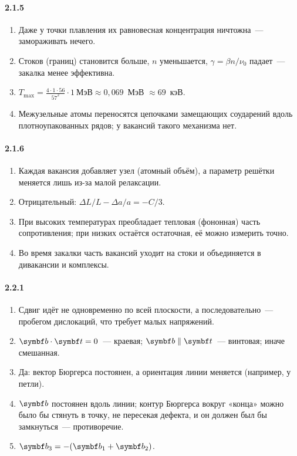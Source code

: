 {\paragraph{2.1.5}
\begin{enumerate}[label=\arabic*.]
\item Даже у точки плавления их равновесная концентрация ничтожна~—
замораживать нечего.
\item Стоков (границ) становится больше, $n$ уменьшается, $\gamma=\beta n/\nu_0$
падает~— закалка менее эффективна.
\item $T_{\max}=\frac{4\cdot1\cdot56}{57^2}\cdot1~\text{МэВ}\approx0{,}069$~МэВ
$\approx69$~кэВ.
\item Межузельные атомы переносятся цепочками замещающих соударений вдоль
плотноупакованных рядов; у вакансий такого механизма нет.
\end{enumerate}

\paragraph{2.1.6}
\begin{enumerate}[label=\arabic*.]
\item Каждая вакансия добавляет узел (атомный объём), а параметр решётки
меняется лишь из-за малой релаксации.
\item Отрицательный: $\Delta L/L-\Delta a/a=-C/3$.
\item При высоких температурах преобладает тепловая (фононная) часть
сопротивления; при низких остаётся остаточная, её можно измерить точно.
\item Во время закалки часть вакансий уходит на стоки и объединяется в
дивакансии и комплексы.
\end{enumerate}

\paragraph{2.2.1}
\begin{enumerate}[label=\arabic*.]
\item Сдвиг идёт не одновременно по всей плоскости, а последовательно~—
пробегом дислокаций, что требует малых напряжений.
\item $\vb b\cdot\vb t=0$~— краевая; $\vb b\parallel\vb t$~— винтовая;
иначе смешанная.
\item Да: вектор Бюргерса постоянен, а ориентация линии меняется
(например, у петли).
\item $\vb b$ постоянен вдоль линии; контур Бюргерса вокруг «конца» можно
было бы стянуть в точку, не пересекая дефекта, и он должен был бы
замкнуться~— противоречие.
\item $\vb b_3=-(\vb b_1+\vb b_2)$.
\end{enumerate}

}

